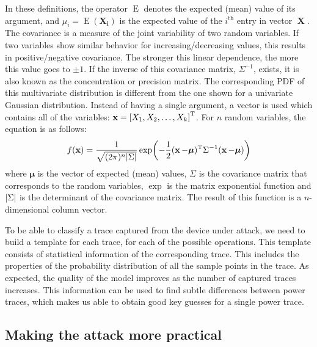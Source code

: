%
In these definitions, the operator $\operatorname{E}$ denotes the expected (mean) value of its argument, and $\mu_i = \operatorname{E}(\bm{X_i})$ is the expected value of the $i^\mathrm{th}$ entry in vector $\operatorname{\textbf{X}}$. 
The covariance is a measure of the joint variability of two random variables.
If two variables show similar behavior for increasing/decreasing values, this results in positive/negative covariance.
The stronger this linear dependence, the more this value goes to $\pm 1$.
If the inverse of this covariance matrix, $\Sigma^{-1}$, exists, it is also known as the concentration or precision matrix.
The corresponding PDF of this multivariate distribution is different from the one shown for a univariate Gaussian distribution.
Instead of having a single argument, a vector is used which contains all of the variables: $\operatorname{\textbf{x}} = \left[ X_1, X_2, \ldots, X_k \right]^{\rm T}$. 
For $n$ random variables, the equation is as follows:
%
\begin{equation*}
f(\operatorname{\textbf{x}}) = \frac{1}{\sqrt{(2\pi)^n \abs{\Sigma}}} \exp( -\frac{1}{2} (\operatorname{\textbf{x}} - \bm{\mu})^{\rm T} \Sigma^{-1} (\operatorname{\textbf{x}} - \bm{\mu}) )
\end{equation*}
%
where $\bm{\mu}$ is the vector of expected (mean) values, $\Sigma$ is the covariance matrix that corresponds to the random variables, $\exp$ is the matrix exponential function and $\abs{\Sigma}$ is the determinant of the covariance matrix. 
The result of this function is a $n$-dimensional column vector.

\vspace{5mm} \noindent
To be able to classify a trace captured from the device under attack, we need to build a template for each trace, for each of the possible operations.
This template consists of statistical information of the corresponding trace.
This includes the properties of the probability distribution of all the sample points in the trace.
As expected, the quality of the model improves as the number of captured traces increases.
This information can be used to find subtle differences between power traces, which makes us able to obtain good key guesses for a single power trace.

\subsection{Making the attack more practical} \label{subsec: Making the attack more practical}

